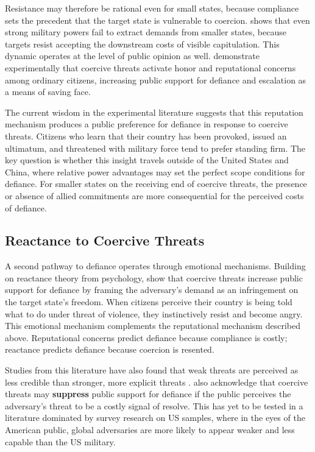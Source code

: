 Resistance may therefore be rational even for small states, because compliance sets the precedent that the target state is vulnerable to coercion. \textcite{sechser_goliaths_2010} shows that even strong military powers fail to extract demands from smaller states, because targets resist accepting the downstream costs of visible capitulation. This dynamic operates at the level of public opinion as well. \textcite{dafoe_coercion_2021, dafoe_provocation_2022} demonstrate experimentally that coercive threats activate honor and reputational concerns among ordinary citizens, increasing public support for defiance and escalation as a means of saving face.

The current wisdom in the experimental literature suggests that this reputation mechanism produces a public preference for defiance in response to coercive threats. Citizens who learn that their country has been provoked, issued an ultimatum, and threatened with military force tend to prefer standing firm. The key question is whether this insight travels outside of the United States and China, where relative power advantages may set the perfect scope conditions for defiance. For smaller states on the receiving end of coercive threats, the presence or absence of allied commitments are more consequential for the perceived costs of defiance. 

\subsection{Reactance to Coercive Threats}
A second pathway to defiance operates through emotional mechanisms. Building on reactance theory from psychology, \textcite{powers_psychology_2023} show that coercive threats increase public support for defiance by framing the adversary's demand as an infringement on the target state's freedom. When citizens perceive their country is being told what to do under threat of violence, they instinctively resist and become angry. This emotional mechanism complements the reputational mechanism described above. Reputational concerns predict defiance because compliance is costly; \autocite{dafoe_coercion_2021, dafoe_provocation_2022} reactance predicts defiance because coercion is resented.\autocite{powers_psychology_2023} 

Studies from this literature have also found that weak threats are perceived as less credible than stronger, more explicit threats \autocite{lupton_threat_2024}. \textcite{powers_psychology_2023} also acknowledge that coercive threats may \textbf{suppress} public support for defiance if the public perceives the adversary's threat to be a costly signal of resolve. This has yet to be tested in a literature dominated by survey research on US samples, where in the eyes of the American public, global adversaries are more likely to appear weaker and less capable than the US military.\autocite{pomeroy_hawks_2024} 

